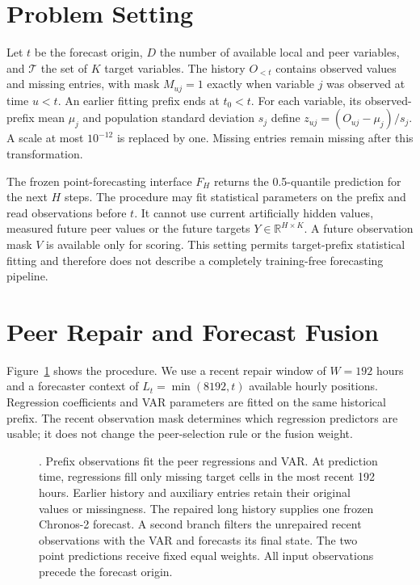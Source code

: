 \section{Problem Setting}
\label{sec:setting}

Let $t$ be the forecast origin, $D$ the number of available local and peer variables, and $\mathcal T$ the set of $K$ target variables. The history $O_{<t}$ contains observed values and missing entries, with mask $M_{uj}=1$ exactly when variable $j$ was observed at time $u<t$. An earlier fitting prefix ends at $t_0<t$. For each variable, its observed-prefix mean $\mu_j$ and population standard deviation $s_j$ define $z_{uj}=(O_{uj}-\mu_j)/s_j$. A scale at most $10^{-12}$ is replaced by one. Missing entries remain missing after this transformation.

The frozen point-forecasting interface $F_H$ returns the 0.5-quantile prediction for the next $H$ steps. The procedure may fit statistical parameters on the prefix and read observations before $t$. It cannot use current artificially hidden values, measured future peer values or the future targets $Y\in\mathbb R^{H\times K}$. A future observation mask $V$ is available only for scoring. This setting permits target-prefix statistical fitting and therefore does not describe a completely training-free forecasting pipeline.

\section{Peer Repair and Forecast Fusion}
\label{sec:method}

Figure~\ref{fig:method} shows the procedure. We use a recent repair window of $W=192$ hours and a forecaster context of $L_t=\min(8192,t)$ available hourly positions. Regression coefficients and VAR parameters are fitted on the same historical prefix. The recent observation mask determines which regression predictors are usable; it does not change the peer-selection rule or the fusion weight.

\begin{figure}[t]
\centering

\caption{\method{}. Prefix observations fit the peer regressions and VAR. At prediction time, regressions fill only missing target cells in the most recent 192 hours. Earlier history and auxiliary entries retain their original values or missingness. The repaired long history supplies one frozen Chronos-2 forecast. A second branch filters the unrepaired recent observations with the VAR and forecasts its final state. The two point predictions receive fixed equal weights. All input observations precede the forecast origin.}
\label{fig:method}
\end{figure}

